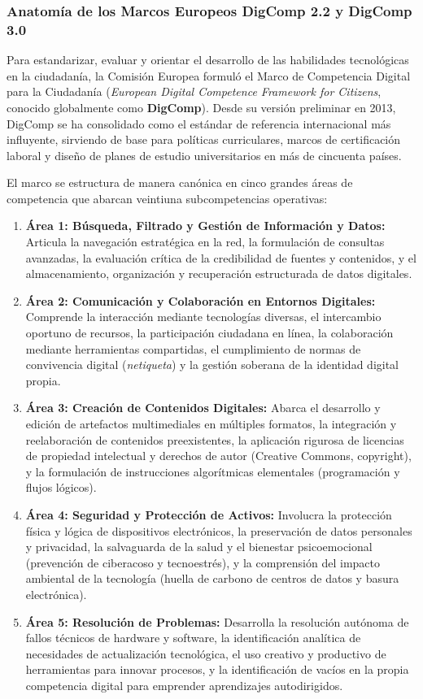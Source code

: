 \subsubsection{Anatomía de los Marcos Europeos DigComp 2.2 y DigComp 3.0}

Para estandarizar, evaluar y orientar el desarrollo de las habilidades tecnológicas en la ciudadanía, la Comisión Europea formuló el Marco de Competencia Digital para la Ciudadanía (\textit{European Digital Competence Framework for Citizens}, conocido globalmente como \textbf{DigComp}). Desde su versión preliminar en 2013, DigComp se ha consolidado como el estándar de referencia internacional más influyente, sirviendo de base para políticas curriculares, marcos de certificación laboral y diseño de planes de estudio universitarios en más de cincuenta países.

El marco se estructura de manera canónica en cinco grandes áreas de competencia que abarcan veintiuna subcompetencias operativas:
\begin{enumerate}
    \item \textbf{Área 1: Búsqueda, Filtrado y Gestión de Información y Datos:} Articula la navegación estratégica en la red, la formulación de consultas avanzadas, la evaluación crítica de la credibilidad de fuentes y contenidos, y el almacenamiento, organización y recuperación estructurada de datos digitales.
    \item \textbf{Área 2: Comunicación y Colaboración en Entornos Digitales:} Comprende la interacción mediante tecnologías diversas, el intercambio oportuno de recursos, la participación ciudadana en línea, la colaboración mediante herramientas compartidas, el cumplimiento de normas de convivencia digital (\textit{netiqueta}) y la gestión soberana de la identidad digital propia.
    \item \textbf{Área 3: Creación de Contenidos Digitales:} Abarca el desarrollo y edición de artefactos multimediales en múltiples formatos, la integración y reelaboración de contenidos preexistentes, la aplicación rigurosa de licencias de propiedad intelectual y derechos de autor (Creative Commons, copyright), y la formulación de instrucciones algorítmicas elementales (programación y flujos lógicos).
    \item \textbf{Área 4: Seguridad y Protección de Activos:} Involucra la protección física y lógica de dispositivos electrónicos, la preservación de datos personales y privacidad, la salvaguarda de la salud y el bienestar psicoemocional (prevención de ciberacoso y tecnoestrés), y la comprensión del impacto ambiental de la tecnología (huella de carbono de centros de datos y basura electrónica).
    \item \textbf{Área 5: Resolución de Problemas:} Desarrolla la resolución autónoma de fallos técnicos de hardware y software, la identificación analítica de necesidades de actualización tecnológica, el uso creativo y productivo de herramientas para innovar procesos, y la identificación de vacíos en la propia competencia digital para emprender aprendizajes autodirigidos.
\end{enumerate}


